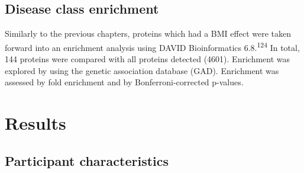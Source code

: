 \documentclass[11pt,twoside]{bristolthesis}
\begin{document}
\hypertarget{disease-class-enrichment}{%
\subsection{Disease class enrichment}\label{disease-class-enrichment}}

Similarly to the previous chapters, proteins which had a BMI effect were taken forward into an enrichment analysis using DAVID Bioinformatics 6.8.\textsuperscript{124} In total, 144 proteins were compared with all proteins detected (4601). Enrichment was explored by using the genetic association database (GAD). Enrichment was assessed by fold enrichment and by Bonferroni-corrected p-values.

\hypertarget{results-4}{%
\section{Results}\label{results-4}}

\hypertarget{participant-characteristics-2}{%
\subsection{Participant characteristics}\label{participant-characteristics-2}}
\end{document}
